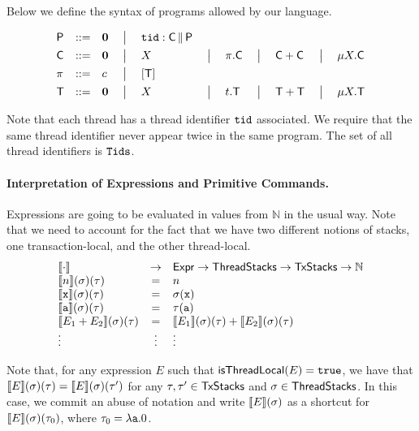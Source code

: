 \documentclass[a4paper,UKenglish]{article}%
\theoremstyle{plain}
\begin{document}
Below we define the syntax of programs allowed by our language. 

\[
\begin{array}{lclclclclcl}
\mathsf{P} &::=& \mathbf{0} &\;\big\lvert\;& \mathtt{tid} : \mathsf{C} \mathop{\lVert} \mathsf{P}\\[4pt]
\mathsf{C} &::=& \mathbf{0} &\;\big\lvert\;& X &\;\big\lvert\;& \pi.\mathsf{C} &\;\big\lvert\;& \mathsf{C} + \mathsf{C} &\;\big\lvert\;& \mu X.\mathsf{C}\\[4pt]
\pi &::=& c &\;\big\lvert\;& [\mathsf{T}]\\[4pt]
\mathsf{T} &::=& \mathbf{0} &\;\big\lvert\;& X &\;\big\lvert\;& t.\mathsf{T} &\;\big\lvert\;& \mathsf{T} + \mathsf{T} &\;\big\lvert\;&  \mu X. \mathsf{T} \\[4pt]
\end{array}
\]
Note that each thread has a thread identifier $\mathtt{tid}$ associated. We require that 
the same thread identifier never appear twice in the same program. The set 
of all thread identifiers is $\mathtt{Tids}$.

\paragraph{\textbf{Interpretation of Expressions and Primitive Commands.}}
Expressions are going to be evaluated in values from $\mathbb{N}$ in the usual way. 
Note that we need to account for the fact that we have two different notions of 
stacks, one transaction-local, and the other thread-local. 
\[
\begin{array}{lcl}
{\llbracket \cdot \rrbracket} &\rightarrow& \mathsf{Expr} \rightarrow \mathsf{ThreadStacks} \rightarrow \mathsf{TxStacks} \rightarrow \mathbb{N}\\
{\llbracket n \rrbracket}(\sigma)(\tau) & = & n\\
{\llbracket \mathtt{x} \rrbracket}(\sigma)(\tau) &=& \sigma(\mathtt{x})\\
{\llbracket \mathtt{a} \rrbracket}(\sigma)(\tau) &=& \tau(\mathtt{a})\\
{\llbracket E_1 + E_2 \rrbracket}(\sigma)(\tau) &=& {\llbracket E_1 \rrbracket}(\sigma)(\tau) + {\llbracket E_2 \rrbracket}(\sigma)(\tau)\\
\vdots &\vdots&\vdots
\end{array}
\]

Note that, for any expression $E$ such that $\mathsf{isThreadLocal}(E) = \mathtt{true}$, we have 
that ${\llbracket E \rrbracket}(\sigma)(\tau) = {\llbracket E \rrbracket}(\sigma)(\tau')$ for 
any $\tau, \tau' \in \mathsf{TxStacks}$ and $\sigma \in \mathsf{ThreadStacks}$. 
In this case, we commit an abuse of notation and write ${\llbracket E \rrbracket}(\sigma)$ 
as a shortcut for ${\llbracket E \rrbracket}(\sigma)(\tau_0)$, where $\tau_0 = 
\lambda \mathtt{a} .0$.
\end{document}
